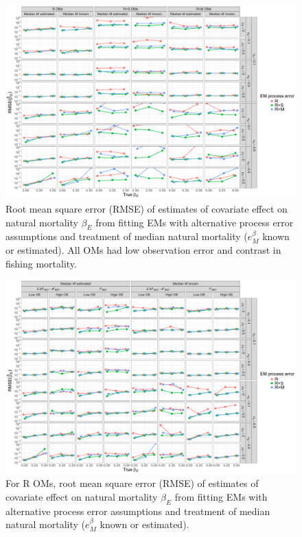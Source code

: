 \documentclass[
  12pt,
]{article}
\begin{document}
\begin{landscape}
\begin{figure}
\begin{center}
\includegraphics[height = \textheight]{beta_E_rmse_main}
\end{center}
\caption{Root mean square error (RMSE) of estimates of covariate effect on natural mortality $\beta_E$ from fitting EMs with alternative process error assumptions and treatment of median natural mortality ($e^\beta_M$ known or estimated). All OMs had low observation error and contrast in fishing mortality.}\label{beta_E_rmse}
\end{figure}
\end{landscape}

\begin{landscape}
\begin{figure}
\begin{center}
\includegraphics[height = \textheight]{beta_E_rmse_Rom}
\end{center}
\caption{For R OMs, root mean square error (RMSE) of estimates of covariate effect on natural mortality $\beta_E$ from fitting EMs with alternative process error assumptions and treatment of median natural mortality ($e^\beta_M$ known or estimated). }\label{beta_E_rmse_Rom}
\end{figure}
\end{landscape}
\end{document}
